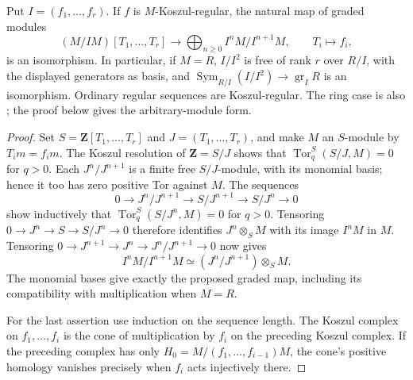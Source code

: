 \begin{theorem}\label{SA23-C-2}
Put $I=(f_1,\ldots,f_r)$.  If $f$ is $M$-Koszul-regular, the natural
map of graded modules
\[
 (M/IM)[T_1,\ldots,T_r]\longrightarrow
 \bigoplus_{n\ge0}I^nM/I^{n+1}M,\qquad T_i\longmapsto f_i,
\]
is an isomorphism.  In particular, if $M=R$, $I/I^2$ is free of rank
$r$ over $R/I$, with the displayed generators as basis, and
$\operatorname{Sym}_{R/I}(I/I^2)\to\operatorname{gr}_I R$ is an
isomorphism.  Ordinary regular sequences are Koszul-regular.
The ring case is also \cite[VII, Proposition 1.3, p.~418]{algSGA6};
the proof below gives the arbitrary-module form.
\end{theorem}
\begin{proof}
Set $S=\mathbf Z[T_1,\ldots,T_r]$ and $J=(T_1,\ldots,T_r)$, and
make $M$ an $S$-module by $T_i m=f_i m$.  The Koszul resolution of
$\mathbf Z=S/J$ shows that
$\operatorname{Tor}^S_q(S/J,M)=0$ for $q>0$.  Each $J^n/J^{n+1}$ is
a finite free $S/J$-module, with its monomial basis; hence it too has
zero positive Tor against $M$.  The sequences
\[
 0\to J^n/J^{n+1}\to S/J^{n+1}\to S/J^n\to0
\]
show inductively that $\operatorname{Tor}^S_q(S/J^n,M)=0$ for
$q>0$.  Tensoring $0\to J^n\to S\to S/J^n\to0$ therefore identifies
$J^n\otimes_S M$ with its image $I^nM$ in $M$.  Tensoring
$0\to J^{n+1}\to J^n\to J^n/J^{n+1}\to0$ now gives
\[
 I^nM/I^{n+1}M\simeq(J^n/J^{n+1})\otimes_S M.
\]
The monomial bases give exactly the proposed graded map, including
its compatibility with multiplication when $M=R$.

For the last assertion use induction on the sequence length.  The
Koszul complex on $f_1,\ldots,f_i$ is the cone of multiplication by
$f_i$ on the preceding Koszul complex.  If the preceding complex has
only $H_0=M/(f_1,\ldots,f_{i-1})M$, the cone's positive homology
vanishes precisely when $f_i$ acts injectively there.
\end{proof}

